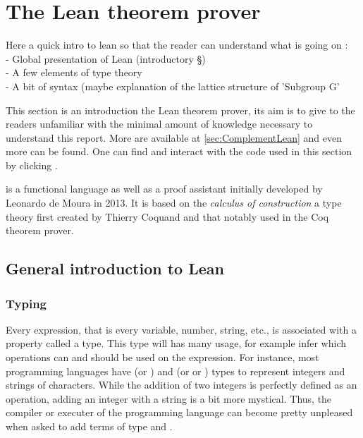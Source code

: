 \section{The Lean theorem prover}
\label{sec:lean-intro}

{\color{green} Here a quick intro to lean so that the reader can understand what is going on : \\
- Global presentation of Lean (introductory §)\\
- A few elements of type theory \\
- A bit of syntax (maybe explanation of the lattice structure of 'Subgroup G'\\ }

This section is an introduction the Lean theorem prover, its aim is to give to the readers unfamiliar with \Lean the minimal amount of knowledge necessary to understand this report. More are available at \ref{sec:ComplementLean} and even more can be found. One can find and interact with the code used in this section by clicking \editor. 

  \Lean is a functional language as well as a proof assistant initially developed by Leonardo de Moura in 2013. 
  It is based on the \emph{calculus of construction} a type theory first created by Thierry Coquand  and that notably used in the Coq theorem prover.
  

\subsection{General introduction to Lean}%
\label{sub:Introduction to type theory}

\subsubsection{Typing}
  Every \Lean expression, that is every variable, number, string, etc., is associated with a property called a type. This type will has many usage, for example infer which operations can and should be used on the expression. For instance, most programming languages have  (or ) and  (or  or ) types to represent integers and strings of characters. While the addition of two integers is perfectly defined as an operation, adding an integer with a string is a bit more mystical. Thus, the compiler or executer of the programming language can become pretty unpleased when asked to add terms of type  and .


